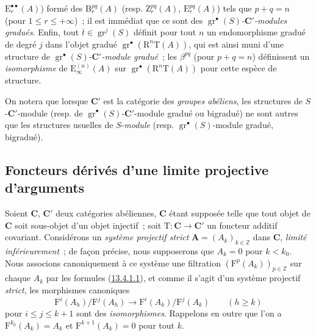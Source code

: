 \begin{env}[13.6.6]
$\mathrm E_r^{\bullet\bullet}(A)$) formé des $\mathrm B_r^{pq}(A)$ (resp.
$\mathrm Z_r^{pq}(A)$, $\mathrm E_r^{pq}(A)$) tels que $p+q=n$ (pour
$1\leq r\leq+\infty$)~; il est immédiat que ce sont des
\emph{$\operatorname{gr}^\bullet(S)$-$\boldsymbol{C}'$-modules gradués}. Enfin, tout
$\overline t\in\operatorname{gr}^j(S)$ définit pour tout $n$ un
endomorphisme gradué de degré $j$ dans l'objet gradué
$\operatorname{gr}^\bullet(\mathrm R^n\mathrm T(A))$, qui est ainsi muni
d'une structure de
$\operatorname{gr}^\bullet(S)$-\emph{$\boldsymbol{C}'$-module gradué}~; les
$\beta^{pq}$ (pour $p+q=n$) définissent un \emph{isomorphisme} de
$\mathrm E_\infty^{(n)}(A)$ sur
$\operatorname{gr}^\bullet(\mathrm R^n\mathrm T(A))$ pour cette espèce
de structure.

On notera que lorsque $\boldsymbol{C}'$ est la catégorie des \emph{groupes abéliens}, les
structures de $S$-$\boldsymbol{C}'$-module (resp. de
$\operatorname{gr}^\bullet(S)$-$\boldsymbol{C}'$-module gradué ou bigradué) ne sont
autres que les structures usuelles de $S$-\emph{module} (resp.
$\operatorname{gr}^\bullet(S)$-module gradué, bigradué).
\end{env}

\subsection{Foncteurs dérivés d'une limite projective d'arguments}
\label{subsection:0.13.7-fr}

\begin{env}[13.7.1]
\label{0.13.7.1-fr}
Soient $\boldsymbol{C}$, $\boldsymbol{C}'$ deux catégories abéliennes, $\boldsymbol{C}$ étant supposée telle
que tout objet de $\boldsymbol{C}$ soit sous-objet d'un objet injectif~; soit
$\mathrm T:\boldsymbol{C}\to \boldsymbol{C}'$ un foncteur additif covariant. Considérons un
\emph{système projectif strict} $\mathbf A=(A_k)_{k\in\mathbb Z}$ dans $\boldsymbol{C}$,
\emph{limité inférieurement}~; de façon précise, nous supposerons que
$A_k=0$ pour $k<k_0$. Nous associons canoniquement à ce système une
filtration $(\mathrm F^p(A_k))_{p\in\mathbb Z}$ sur chaque $A_k$ par les
formules (\hyperref[0.13.4.1.1-fr]{13.4.1.1}), et comme il s'agit d'un
système projectif \emph{strict}, les morphismes canoniques
\begin{equation}
\label{0.13.7.1.1-fr}
\tag{13.7.1.1}
\mathrm F^i(A_h)/\mathrm F^j(A_h)\to
\mathrm F^i(A_k)/\mathrm F^j(A_k)\qquad(h\geq k)
\end{equation}
pour $i\leq j\leq k+1$ sont des \emph{isomorphismes}. Rappelons en outre que
l'on a $\mathrm F^{k_0}(A_k)=A_k$ et $\mathrm F^{k+1}(A_k)=0$ pour tout
$k$.
\end{env}


